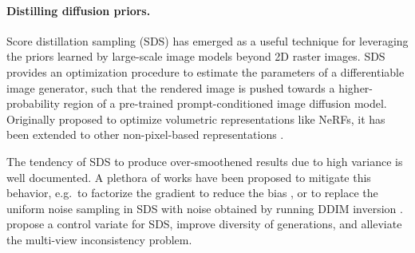 \paragraph{Distilling diffusion priors.}

Score distillation sampling (SDS) \cite{poole2022dreamfusion,sjc} has emerged as a useful technique for leveraging the priors learned by large-scale image models beyond 2D raster images. SDS provides an optimization procedure to estimate the parameters of a differentiable image generator, such that the rendered image is pushed towards a higher-probability region of a pre-trained prompt-conditioned image diffusion model. Originally proposed to optimize volumetric representations like NeRFs, it has been extended to other non-pixel-based representations \cite{jain2023vectorfusion,yi2023gaussiandreamer,bah20244dfy,Thamizharasan_2024_CVPR}.

The tendency of SDS to produce over-smoothened results due to high variance is well documented. A plethora of works have been proposed to mitigate this behavior, e.g.\ to factorize the gradient to reduce the bias \cite{hertz2023delta,yu2024texttod,katzir2024noisefree,alldieck2024scoredistillationsamplinglearned}, or
to replace the uniform noise sampling in SDS with noise obtained by running DDIM inversion \citet{EnVision2023luciddreamer,lukoianov2024score}. \citet{wang2023steindreamer} propose a control variate for SDS, \citet{wang2023prolificdreamer, xu2024diversescoredistillation,yan2025consistentflowdistillation} improve diversity of generations, and \citet{wang2024esd} alleviate the multi-view inconsistency problem.


